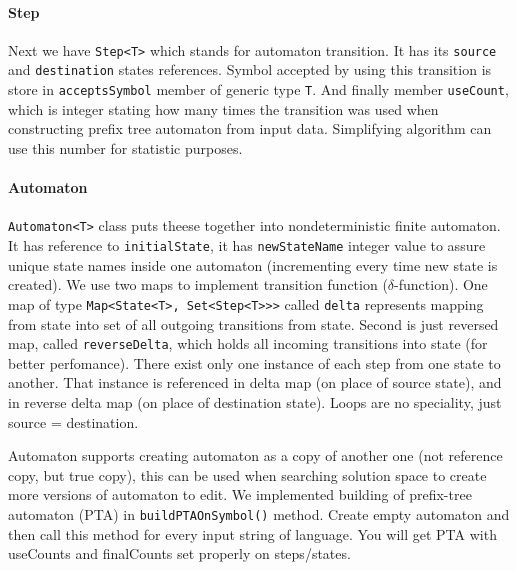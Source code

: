 \documentclass[a4paper,10pt,oneside]{article}
\newcommand{\code}[1]{\texttt{#1}}
\begin{document}
\paragraph{Step}
Next we have \code{Step<T>} which stands for automaton transition.
It has its \code{source} and \code{destination} states references.
Symbol accepted by using this transition is store in \code{acceptsSymbol} member of generic type \code{T}.
And finally member \code{useCount}, which is integer stating how many times the transition was used when constructing prefix tree automaton from input data.
Simplifying algorithm can use this number for statistic purposes.

\paragraph{Automaton}
\code{Automaton<T>} class puts theese together into nondeterministic finite automaton.
It has reference to \code{initialState}, it has \code{newStateName} integer value to assure unique state names inside one automaton (incrementing every time new state is created).
We use two maps to implement transition function ($\delta$-function).
One map of type \code{Map<State<T>, Set<Step<T>{}>{}>} called \code{delta} represents mapping from state into set of all outgoing transitions from state.
Second is just reversed map, called \code{reverseDelta}, which holds all incoming transitions into state (for better perfomance).
There exist only one instance of each step from one state to another.
That instance is referenced in delta map (on place of source state), and in reverse delta map (on place of destination state).
Loops are no speciality, just source = destination.

Automaton supports creating automaton as a copy of another one (not reference copy, but true copy), this can be used when searching solution space to create more versions of automaton to edit.
We implemented building of prefix-tree automaton (PTA) in \code{buildPTAOnSymbol()} method.
Create empty automaton and then call this method for every input string of language.
You will get PTA with useCounts and finalCounts set properly on steps/states.
\end{document}
